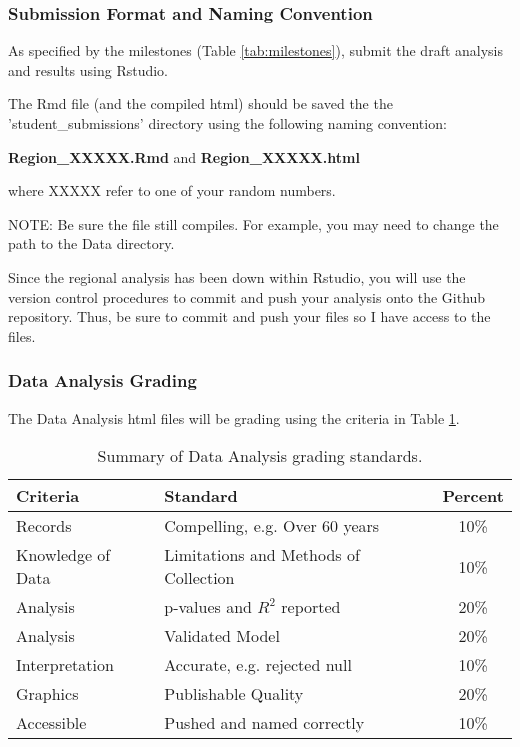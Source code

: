 \subsubsection{Submission Format and Naming Convention}

As specified by the milestones (Table \ref{tab:milestones}), submit the draft analysis and results using Rstudio. 

The Rmd file (and the compiled html) should be saved the the 'student\_submissions' directory using the following naming convention:

\begin{center}
\textbf{Region\_XXXXX.Rmd} and \textbf{Region\_XXXXX.html}
\end{center}


\medskip \noindent where XXXXX refer to one of your random numbers.

NOTE: Be sure the file still compiles. For example, you may need to change the path to the Data directory. 

Since the regional analysis has been down within Rstudio, you will use the version control procedures to commit and push your analysis onto the Github repository. Thus, be sure to commit and push your files so I have access to the files. 

\subsubsection{Data Analysis Grading}

The Data Analysis html files will be grading using the criteria in Table \ref{tab:datagrading}.

\begin{table}[h]
\caption{Summary of Data Analysis grading standards.}
\label{tab:datagrading}
\begin{tabular}{llc}\hline
Criteria            &   Standard    & Percent \\ \hline\hline
Records  & Compelling, e.g. Over 60 years & 10\% \\
Knowledge of Data & Limitations and Methods of Collection & 10\% \\
Analysis & p-values and $R^2$ reported  & 20\% \\
Analysis          & Validated Model     & 20\% \\
Interpretation    & Accurate, e.g. rejected null   & 10\% \\
Graphics          & Publishable Quality & 20\% \\
Accessible        & Pushed and named correctly & 10\% \\
\hline
\end{tabular}
\end{table}